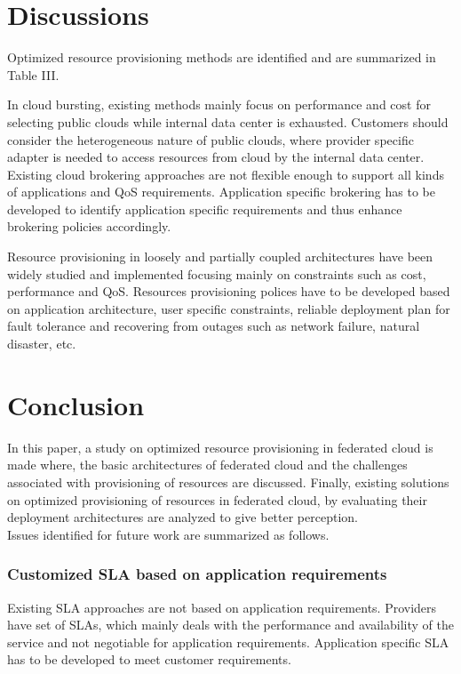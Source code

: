 \documentclass[conference]{IEEEtran}
\begin{document}
\section{Discussions}

Optimized resource provisioning methods are identified and are summarized in Table III.

In cloud bursting, existing methods mainly focus on performance and cost for selecting public clouds while internal data center is exhausted. Customers should consider the heterogeneous nature of public clouds, where provider specific adapter is needed to access resources from cloud by the internal data center. Existing cloud brokering approaches are not flexible enough to support all kinds of applications and QoS requirements. Application specific brokering has to be developed to identify application specific requirements and thus enhance brokering policies accordingly.

Resource provisioning in loosely and partially coupled architectures have been widely studied and implemented focusing mainly on constraints such as cost, performance and QoS. Resources provisioning polices have to be developed based on application architecture, user specific constraints, reliable deployment plan for fault tolerance and recovering from outages such as network failure, natural disaster, etc.



\section{Conclusion}
In this paper, a study on optimized resource provisioning in federated cloud is made where, the basic architectures of federated cloud and the challenges associated with provisioning of resources are discussed. Finally, existing solutions on optimized provisioning of resources in federated cloud, by evaluating their deployment architectures are analyzed to give better perception. \\
\newline
Issues identified for future work are summarized as follows.
\subsubsection{Customized SLA based on application requirements} Existing SLA approaches are not based on application requirements. Providers have set of SLAs, which mainly deals with the performance and availability of the service and not negotiable for application requirements. Application specific SLA has to be developed to meet customer requirements.
\end{document}
